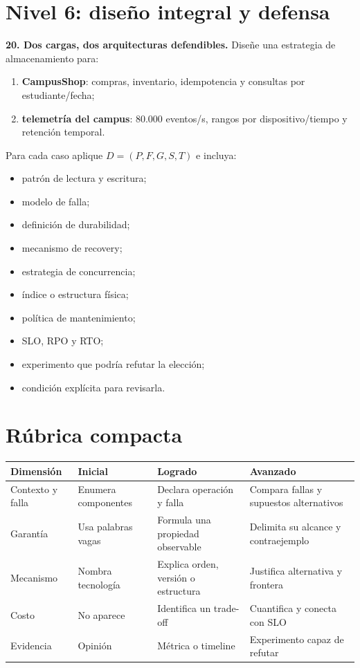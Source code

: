 \documentclass[variant=guia,cover=institutional,mode=screen]{ua-engineering-v6-article}
\begin{document}
\section{Nivel 6: diseño integral y defensa}

\begin{uaexercise}
\textbf{20. Dos cargas, dos arquitecturas defendibles.} Diseñe una estrategia de almacenamiento para:

\begin{enumerate}
\item \textbf{CampusShop}: compras, inventario, idempotencia y consultas por estudiante/fecha;
\item \textbf{telemetría del campus}: 80.000 eventos/s, rangos por dispositivo/tiempo y retención temporal.
\end{enumerate}

Para cada caso aplique $D=(P,F,G,S,T)$ e incluya:

\begin{itemize}
\item patrón de lectura y escritura;
\item modelo de falla;
\item definición de durabilidad;
\item mecanismo de recovery;
\item estrategia de concurrencia;
\item índice o estructura física;
\item política de mantenimiento;
\item SLO, RPO y RTO;
\item experimento que podría refutar la elección;
\item condición explícita para revisarla.
\end{itemize}
\end{uaexercise}

\section{Rúbrica compacta}

\begin{center}
\begin{tabular}{p{}p{}p{}p{}}
\toprule
Dimensión & Inicial & Logrado & Avanzado \\
\midrule
Contexto y falla & Enumera componentes & Declara operación y falla & Compara fallas y supuestos alternativos \\
Garantía & Usa palabras vagas & Formula una propiedad observable & Delimita su alcance y contraejemplo \\
Mecanismo & Nombra tecnología & Explica orden, versión o estructura & Justifica alternativa y frontera \\
Costo & No aparece & Identifica un trade-off & Cuantifica y conecta con SLO \\
Evidencia & Opinión & Métrica o timeline & Experimento capaz de refutar \\
\bottomrule
\end{tabular}
\end{center}
\end{document}
